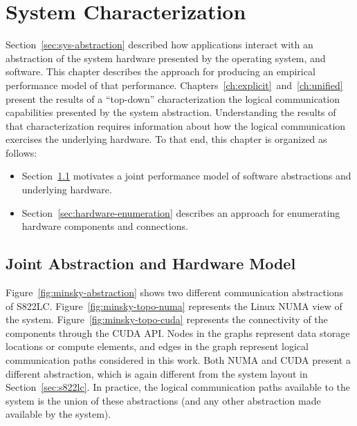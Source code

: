 \chapter{System Characterization}
\label{ch:sys-char}

Section~\ref{sec:sys-abstraction} described how applications interact with an abstraction of the system hardware presented by the operating system, and software.
This chapter describes the approach for producing an empirical performance model of that performance.
Chapters~\ref{ch:explicit}~and~\ref{ch:unified} present the results of a ``top-down'' characterization the logical communication capabilities presented by the system abstraction.
Understanding the results of that characterization requires information about how the logical communication exercises the underlying hardware.
To that end, this chapter is organized as follows:
\begin{itemize}
    \item Section~\ref{sec:abstraction-hardware} motivates a joint performance model of software abstractions and underlying hardware.
    \item Section~\ref{sec:hardware-enumeration} describes an approach for enumerating hardware components and connections.
\end{itemize}

\section{Joint Abstraction and Hardware Model}
\label{sec:abstraction-hardware}

Figure~\ref{fig:minsky-abstraction} shows two different communication abstractions of S822LC.
Figure~\ref{fig:minsky-topo-numa} represents the Linux NUMA view of the system.
Figure~\ref{fig:minsky-topo-cuda} represents the connectivity of the components through the CUDA API.
Nodes in the graphs represent data storage locations or compute elements, and edges in the graph represent logical communication paths considered in this work.
Both NUMA and CUDA present a different abstraction, which is again different from the system layout in Section~\ref{sec:s822lc}.
In practice, the logical communication paths available to the system is the union of these abstractions (and any other abstraction made available by the system).

